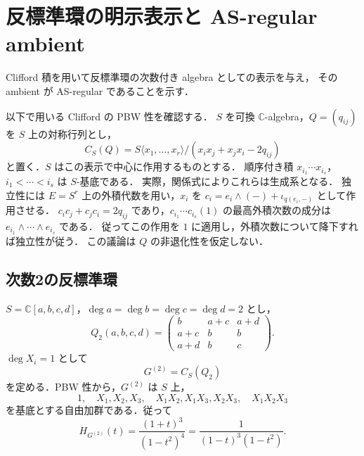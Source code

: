 \section{反標準環の明示表示と AS-regular ambient}
\label{sec:explicit-ambient}

Clifford 積を用いて反標準環の次数付き algebra としての表示を与え，
その ambient が AS-regular であることを示す．

以下で用いる Clifford の PBW 性を確認する．
$S$ を可換 $\mathbb C$-algebra，$Q=(q_{ij})$ を $S$ 上の対称行列とし，
\[
 C_S(Q)=S\langle x_1,\ldots,x_r\rangle/
 (x_ix_j+x_jx_i-2q_{ij})
\]
と置く．$S$ はこの表示で中心に作用するものとする．
順序付き積 $x_{i_1}\cdots x_{i_s}$，$i_1<\cdots<i_s$ は $S$-基底である．
実際，関係式によりこれらは生成系となる．
独立性には $E=S^r$ 上の外積代数を用い，$x_i$ を
$c_i=e_i\wedge(-)+\iota_{q(e_i,-)}$ として作用させる．
$c_ic_j+c_jc_i=2q_{ij}$ であり，$c_{i_1}\cdots c_{i_s}(1)$ の最高外積次数の成分は
$e_{i_1}\wedge\cdots\wedge e_{i_s}$ である．
従ってこの作用を $1$ に適用し，外積次数について降下すれば独立性が従う．
この議論は $Q$ の非退化性を仮定しない．

\subsection{次数2の反標準環}

$S=\mathbb C[a,b,c,d]$，$\deg a=\deg b=\deg c=\deg d=2$ とし，
\[
 Q_2(a,b,c,d)=
 \begin{pmatrix}
 b&a+c&a+d\\
 a+c&b&b\\
 a+d&b&c
 \end{pmatrix}.
\]
$\deg X_i=1$ として
\begin{equation}
 G^{(2)}=C_S(Q_2)
 \label{eq:ambient-d2}
\end{equation}
を定める．PBW 性から，$G^{(2)}$ は $S$ 上，
\[
 1,\quad X_1,X_2,X_3,\quad X_1X_2,X_1X_3,X_2X_3,
 \quad X_1X_2X_3
\]
を基底とする自由加群である．従って
\begin{equation}
 H_{G^{(2)}}(t)
 =\frac{(1+t)^3}{(1-t^2)^4}
 =\frac{1}{(1-t)^3(1-t^2)}.
 \label{eq:ambient-d2-hilbert}
\end{equation}

